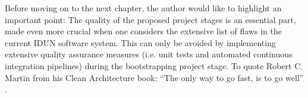 Before moving on to the next chapter, the author would like to highlight an important point: The quality of the proposed project stages is an essential part, made even more crucial when one considers the extensive list of flaws in the current IDUN software system. This can only be avoided by implementing extensive quality assurance measures (i.e. unit tests and automated continuous integration pipelines) during the bootstrapping project stage. To quote Robert C. Martin from his Clean Architecture book: “The only way to go fast, is to go well” \citep{martin_clean_2018}.

